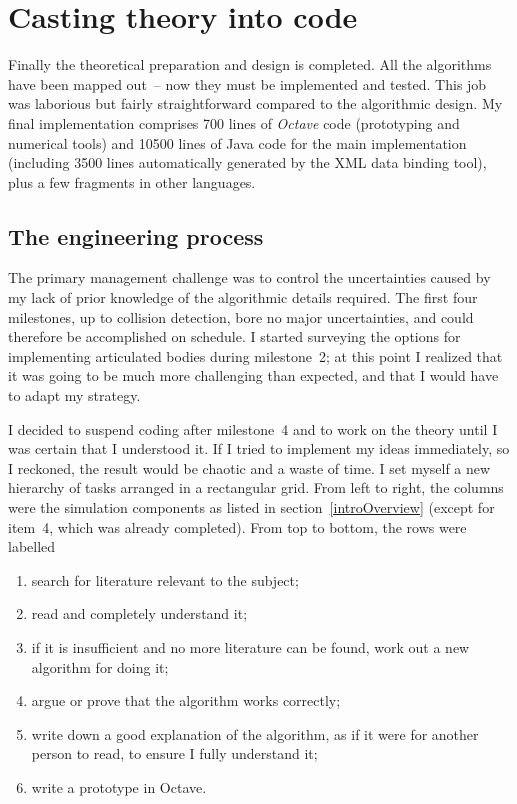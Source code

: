 \section{Casting theory into code\label{implementation}}

Finally the theoretical preparation and design is completed. All the algorithms have been mapped
out~-- now they must be implemented and tested. This job was laborious but fairly straightforward
compared to the algorithmic design. My final implementation comprises 700 lines of \textsl{Octave}
code (prototyping and numerical tools) and 10500 lines of Java code for the main implementation
(including 3500 lines automatically generated by the XML data binding tool), plus a few fragments
in other languages.

\subsection{The engineering process}

The primary management challenge was to control the uncertainties caused by my lack of prior
knowledge of the algorithmic details required. The first four milestones, up to collision
detection, bore no major uncertainties, and could therefore be accomplished on schedule. I started
surveying the options for implementing articulated bodies during milestone~2; at this point I
realized that it was going to be much more challenging than expected, and that I would have to
adapt my strategy.

I decided to suspend coding after milestone~4 and to work on the theory until I was certain that
I understood it. If I tried to implement my ideas immediately, so I reckoned, the result would be
chaotic and a waste of time. I set myself a new hierarchy of tasks arranged in a rectangular grid.
From left to right, the columns were the simulation components as listed in
section~\ref{introOverview} (except for item~4, which was already completed). From top to bottom,
the rows were labelled
\begin{enumerate}
\item search for literature relevant to the subject;
\item read and completely understand it;
\item if it is insufficient and no more literature can be found, work out a new algorithm for
    doing it;
\item argue or prove that the algorithm works correctly;
\item write down a good explanation of the algorithm, as if it were for another person to read, to
    ensure I fully understand it;
\item write a prototype in Octave.
\end{enumerate}

